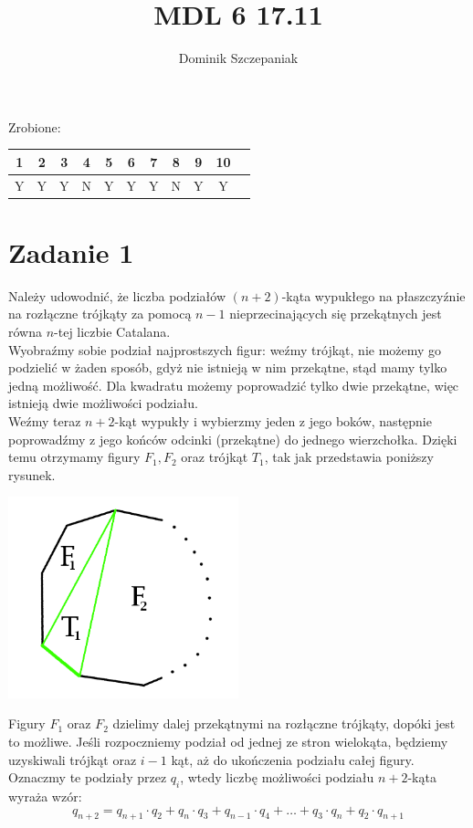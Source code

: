 \documentclass[12pt]{article}
\title{MDL 6 17.11}
\author{Dominik Szczepaniak}
\begin{document}
\maketitle
Zrobione:
\begin{tabular}{|| c c c c c c c c c c c||}
    \hline
    1 & 2 & 3 & 4 & 5 & 6 & 7 & 8 & 9 & 10  \\
    \hline
    Y & Y & Y & N & Y & Y & Y & N & Y & Y
\end{tabular}

\bgroup\obeylines

\section{Zadanie 1}
Należy udowodnić, że liczba podziałów $(n+2)$-kąta wypukłego na płaszczyźnie na rozłączne trójkąty za pomocą $n-1$ nieprzecinających się przekątnych jest równa $n$-tej liczbie Catalana. \\

Wyobraźmy sobie podział najprostszych figur: weźmy trójkąt, nie możemy go podzielić w żaden sposób, gdyż nie istnieją w nim przekątne, stąd mamy tylko jedną możliwość. Dla kwadratu możemy poprowadzić tylko dwie przekątne, więc istnieją dwie możliwości podziału. \\

Weźmy teraz $n+2$-kąt wypukły i wybierzmy jeden z jego boków, następnie poprowadźmy z jego końców odcinki (przekątne) do jednego wierzchołka. Dzięki temu otrzymamy figury $F_1, F_2$ oraz trójkąt $T_1$, tak jak przedstawia poniższy rysunek.

\includegraphics[width=0.5\textwidth]{zad1.png}

Figury $F_1$ oraz $F_2$ dzielimy dalej przekątnymi na rozłączne trójkąty, dopóki jest to możliwe. Jeśli rozpoczniemy podział od jednej ze stron wielokąta, będziemy uzyskiwali trójkąt oraz $i-1$ kąt, aż do ukończenia podziału całej figury. Oznaczmy te podziały przez $q_i$, wtedy liczbę możliwości podziału $n+2$-kąta wyraża wzór:
\[ q_{n+2} = q_{n+1} \cdot q_2 + q_{n} \cdot q_3 + q_{n-1} \cdot q_4 + \ldots + q_3 \cdot q_{n} + q_2 \cdot q_{n+1} \]
\end{document}
